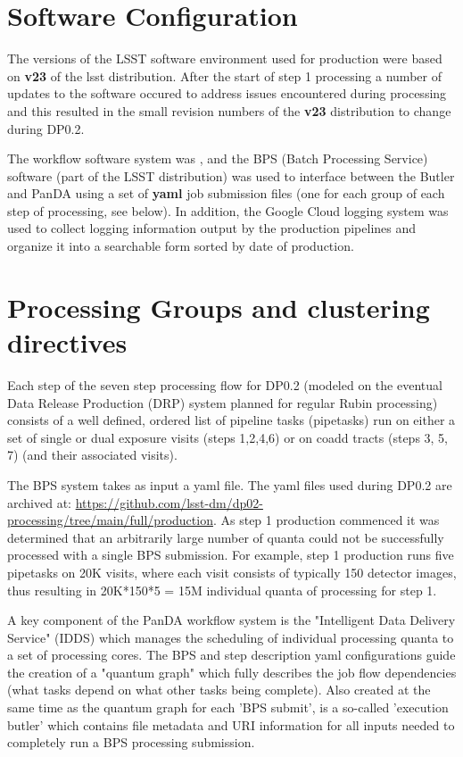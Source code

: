 \documentclass[OPS,authoryear,toc]{lsstdoc}
\begin{document}
\section{Software Configuration}

The versions of the LSST software environment used for production were
based on {\bf v23} of the lsst distribution.  After the start of step 1 
processing a number of updates to
the software occured to address issues encountered during processing
and this resulted in the small revision numbers of the {\bf v23} distribution
to change during DP0.2.

The workflow software system was \cite{PanDA}, and the 
BPS (Batch Processing Service) software 
(part of the LSST distribution) was used to interface between the Butler 
and PanDA using a set of {\bf yaml} job submission files 
(one for each group of each step of processing, see below). In addition, the Google Cloud logging system was
used to collect logging information output by the production pipelines and
organize it into a searchable form sorted by date of production.

\section{Processing Groups and clustering directives}

Each step of the seven step processing flow for DP0.2 
(modeled on the eventual Data Release Production (DRP) system 
planned for regular Rubin processing) consists of a well
defined, ordered list of pipeline tasks (pipetasks) run on either a set of 
single or dual exposure visits (steps 1,2,4,6) or on 
coadd tracts (steps 3, 5, 7) (and their associated visits).  

The BPS system takes as input a yaml file. The yaml files used during DP0.2 are archived at: \url{https://github.com/lsst-dm/dp02-processing/tree/main/full/production}.  As step 1 production commenced it was determined that an arbitrarily
large number of quanta could not be successfully processed with a single
BPS submission.  For example, step 1 production runs five pipetasks on 
20K visits, where each visit consists of typically 150 detector images,
thus resulting in 20K*150*5 = 15M individual quanta of processing for
step 1.  

A key component of the PanDA workflow system is the "Intelligent Data Delivery Service" (IDDS) which manages the scheduling of individual processing
quanta to a set of processing cores. The BPS and step description yaml configurations guide the creation of a "quantum graph" which fully describes the job flow
dependencies (what tasks depend on what other tasks being complete).  Also
created at the same time as the quantum graph for each 'BPS submit', is a
so-called 'execution butler' which contains file metadata and 
URI information for all inputs needed to completely run a BPS processing submission.
\end{document}
